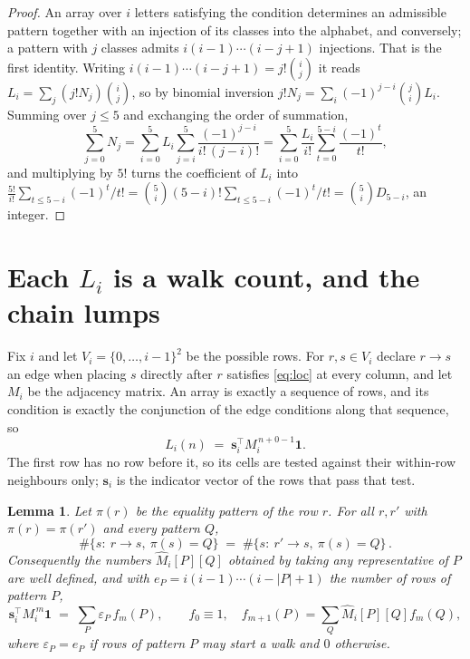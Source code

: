 \documentclass[11pt,a4paper]{article}
\theoremstyle{plain}
\newtheorem{lemma}[theorem]{Lemma}
\theoremstyle{definition}
\begin{document}
\begin{proof}
An array over $i$ letters satisfying the condition determines an admissible pattern together
with an injection of its classes into the alphabet, and conversely; a pattern with $j$
classes admits $i(i-1)\cdots(i-j+1)$ injections. That is the first identity. Writing
$i(i-1)\cdots(i-j+1)=j!\binom{i}{j}$ it reads $L_i=\sum_j (j!N_j)\binom{i}{j}$, so by
binomial inversion $j!N_j=\sum_{i}(-1)^{j-i}\binom{j}{i}L_i$. Summing over
$j\le 5$ and exchanging the order of summation,
\[
\sum_{j=0}^{5}N_j=\sum_{i=0}^{5}L_i\sum_{j=i}^{5}\frac{(-1)^{j-i}}{i!\,(j-i)!}
=\sum_{i=0}^{5}\frac{L_i}{i!}\sum_{t=0}^{5-i}\frac{(-1)^t}{t!} ,
\]
and multiplying by $5!$ turns the coefficient of $L_i$ into
$\frac{5!}{i!}\sum_{t\le 5-i}(-1)^t/t!=\binom{5}{i}(5-i)!\sum_{t\le 5-i}(-1)^t/t!
=\binom{5}{i}D_{5-i}$, an integer.
\end{proof}

\section{Each $L_i$ is a walk count, and the chain lumps}

Fix $i$ and let $V_i=\{0,\dots,i-1\}^{2}$ be the possible rows. For $r,s\in V_i$
declare $r\to s$ an edge when placing $s$ directly after $r$ satisfies \eqref{eq:loc} at
every column, and let $M_i$ be the adjacency matrix. An array is exactly a sequence of
rows, and its condition is exactly the conjunction of the edge conditions along that
sequence, so
\[
L_i(n)\;=\;\mathbf{s}_i^{\!\top}M_i^{\,n+0-1}\mathbf{1} .
\]
The first row has no row before it, so its cells are tested
against their within-row neighbours only; $\mathbf{s}_i$ is the indicator vector of the
rows that pass that test.

\begin{lemma}\label{lem:lump}
Let $\pi(r)$ be the equality pattern of the row $r$. For all $r,r'$ with
$\pi(r)=\pi(r')$ and every pattern $Q$,
\[
\#\{s:\ r\to s,\ \pi(s)=Q\}\;=\;\#\{s:\ r'\to s,\ \pi(s)=Q\}\, .
\]
Consequently the numbers $\widehat M_i[P][Q]$ obtained by taking any representative of $P$
are well defined, and with $e_P=i(i-1)\cdots(i-|P|+1)$ the number of rows of pattern $P$,
\[
\mathbf{s}_i^{\!\top}M_i^{\,m}\mathbf{1}\;=\;\sum_P \varepsilon_P\,f_m(P),
\qquad f_0\equiv1,\quad f_{m+1}(P)=\sum_Q\widehat M_i[P][Q]f_m(Q),
\]
where $\varepsilon_P=e_P$ if rows of pattern $P$ may start a walk and $0$ otherwise.
\end{lemma}
\end{document}
